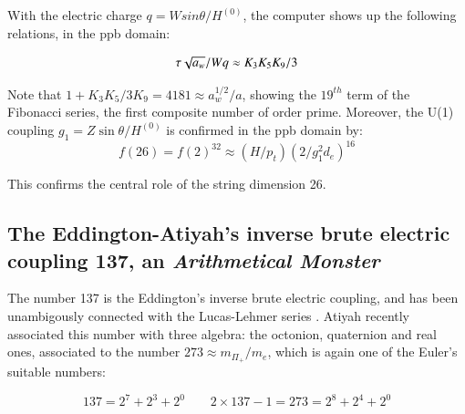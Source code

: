 \documentclass[a4paper,9pt]{article}
\newcounter{row}
\begin{document}
 
 
 

With the electric charge $q = Wsin\theta/H^{(0)}$, the computer shows up the following relations, in the ppb domain: 

\begin{equation}\label{Eq32}
 \tau \sqrt{a_w}/ W q \approx K_3 K_5 K_9/3 \\
\end{equation}

Note that $1 + K_3K_5/3K_9 = 4181 \approx a_w^{1/2}/a$, showing the $19^{th}$ term of the Fibonacci series, the first composite number of order prime.
Moreover, the U(1) coupling $g_1 = Z\sin \theta/H^{(0)}$ is confirmed in the ppb domain by:
\begin{equation}\label{Eq33}
 f(26) = f(2)^{32} \approx (H/p_t)(2/g_1^2 d_e)^{16}
 \end{equation}
 
 This confirms the central role of the string dimension 26.
 

 
 
 

\subsection{The Eddington-Atiyah's inverse brute electric coupling 137, an \textit{Arithmetical Monster}}

The number 137 is the Eddington's inverse brute electric coupling, and has been unambigously connected with the Lucas-Lehmer series \cite{Sanchez2}. Atiyah recently associated this number with three algebra: the octonion, quaternion and real ones, associated to the number $273 \approx m_{\Pi_+}/m_e $, which is again one of the Euler's suitable numbers:

\begin{equation}\label{Eq34}
137 = 2^7 + 2^3 + 2^0    ~~~~~~~~~2\times 137 - 1 = 273 = 2^8 + 2^4 + 2^0 
 \end{equation}
\end{document}
